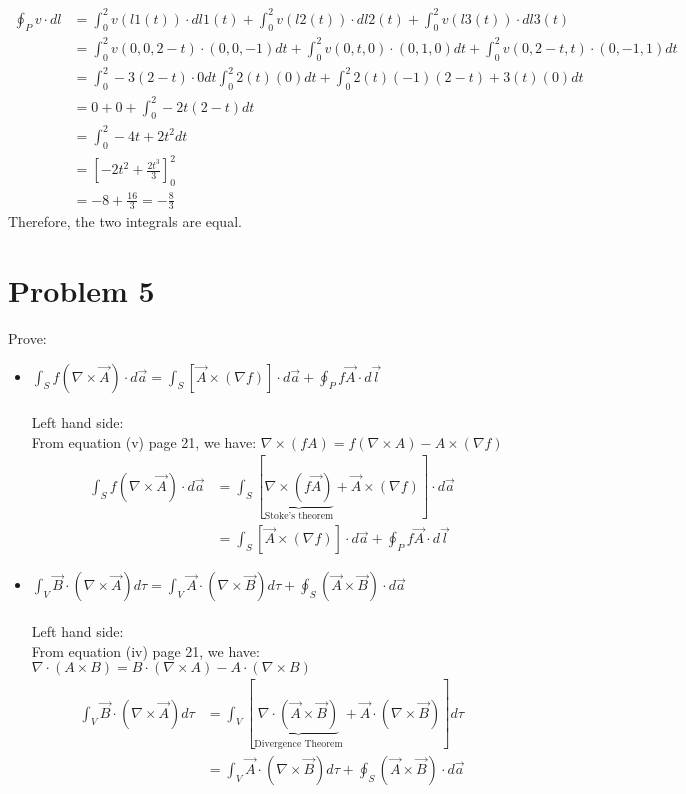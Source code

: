 \documentclass[12pt]{article}
\begin{document}
\begin{align*}
	\oint_P v \cdot dl &= \int_{0}^{2} v(l1(t)) \cdot dl1(t) + \int_{0}^{2} v(l2(t)) \cdot dl2(t) + \int_{0}^{2} v(l3(t)) \cdot dl3(t) \\
	&= \int_{0}^{2} v(0,0,2-t) \cdot (0,0,-1) dt + \int_{0}^{2} v(0,t,0) \cdot (0,1,0) dt + \int_{0}^{2} v(0,2-t,t) \cdot (0,-1,1) dt \\
	&= \int_{0}^{2} -3(2-t)\cdot 0 dt \int_{0}^{2} 2(t)(0) dt + \int_{0}^{2} 2(t)(-1)(2-t) + 3(t)(0)dt \\
	&= 0 + 0 + \int_{0}^{2} -2t(2-t) dt \\
	&= \int_{0}^{2} -4t + 2t^2 dt \\
	&= \left[-2t^2 + \frac{2t^3}{3}\right]_{0}^{2} \\
	&= -8 + \frac{16}{3} = -\frac{8}{3}
\end{align*}
Therefore, the two integrals are equal.
\section*{Problem 5}
Prove:
\begin{itemize}
	\item \(\int_{S}^{} f(\nabla \times \vec{A}) \cdot d\vec{a} = \int_{S}^{} [\vec{A} \times (\nabla f)]\cdot d\vec{a} + \oint_P f\vec{A} \cdot d\vec{l}\)\\
	\\
	Left hand side: \\
	From equation (v) page 21, we have: \(\nabla \times (fA) = f(\nabla \times A) - A \times (\nabla f)\)\\
	\begin{align*}
		\int_{S}^{} f(\nabla \times \vec{A}) \cdot d\vec{a} &= \int_{S}^{} [\underbrace{\nabla \times (f\vec{A})}_{\text{Stoke's theorem}} + \vec{A} \times (\nabla f)] \cdot d\vec{a} \\
		&=  \int_{S}^{} [\vec{A} \times (\nabla f)]\cdot d\vec{a} + \oint_P f\vec{A} \cdot d\vec{l}
	\end{align*}
	
	\item \(\int_{V}^{}\vec{B} \cdot (\nabla \times \vec{A}) d\tau = \int_{V}^{}\vec{A}\cdot(\nabla \times \vec{B}) d\tau + \oint_S (\vec{A} \times \vec{B}) \cdot d\vec{a}\)
	\\ \\
	Left hand side: \\
	From equation (iv) page 21, we have: \(\nabla \cdot (A\times B) = B \cdot (\nabla \times A) - A \cdot (\nabla \times B)\)
	\begin{align*}
		\int_{V}^{}\vec{B} \cdot (\nabla \times \vec{A}) d\tau &= \int_{V}^{}[\underbrace{\nabla \cdot (\vec{A} \times \vec{B})}_{\text{Divergence Theorem}} + \vec{A} \cdot (\nabla \times \vec{B})] d\tau \\
		&= \int_{V}^{}\vec{A}\cdot(\nabla \times \vec{B}) d\tau + \oint_S(\vec{A} \times \vec{B}) \cdot d\vec{a}
	\end{align*}
\end{itemize}
\end{document}
